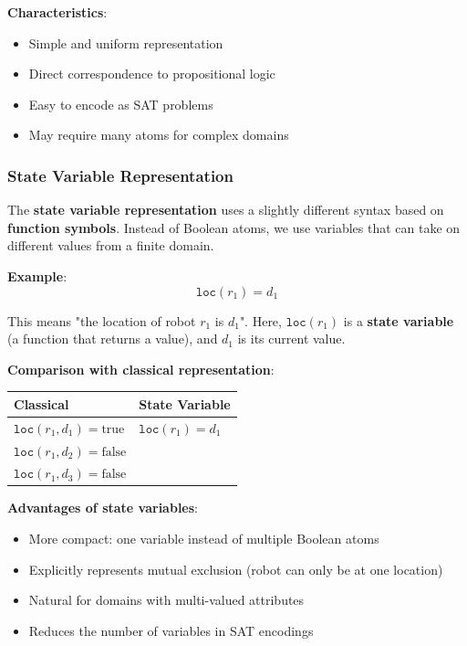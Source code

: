 \documentclass[11pt,a4paper]{article}
\theoremstyle{definition}
\theoremstyle{plain}
\theoremstyle{remark}
\begin{document}
\textbf{Characteristics}:
\begin{itemize}
    \item Simple and uniform representation
    \item Direct correspondence to propositional logic
    \item Easy to encode as SAT problems
    \item May require many atoms for complex domains
\end{itemize}

\subsubsection{State Variable Representation}

The \textbf{state variable representation} uses a slightly different syntax based on \textbf{function symbols}. Instead of Boolean atoms, we use variables that can take on different values from a finite domain.

\textbf{Example}:
\[
\texttt{loc}(r_1) = d_1
\]

This means "the location of robot $r_1$ is $d_1$". Here, $\texttt{loc}(r_1)$ is a \textbf{state variable} (a function that returns a value), and $d_1$ is its current value.

\textbf{Comparison with classical representation}:

\begin{center}
\begin{tabular}{|l|l|}
\hline
\textbf{Classical} & \textbf{State Variable} \\
\hline
$\texttt{loc}(r_1, d_1) = \text{true}$ & $\texttt{loc}(r_1) = d_1$ \\
$\texttt{loc}(r_1, d_2) = \text{false}$ & \\
$\texttt{loc}(r_1, d_3) = \text{false}$ & \\
\hline
\end{tabular}
\end{center}

\textbf{Advantages of state variables}:
\begin{itemize}
    \item More compact: one variable instead of multiple Boolean atoms
    \item Explicitly represents mutual exclusion (robot can only be at one location)
    \item Natural for domains with multi-valued attributes
    \item Reduces the number of variables in SAT encodings
\end{itemize}
\end{document}
